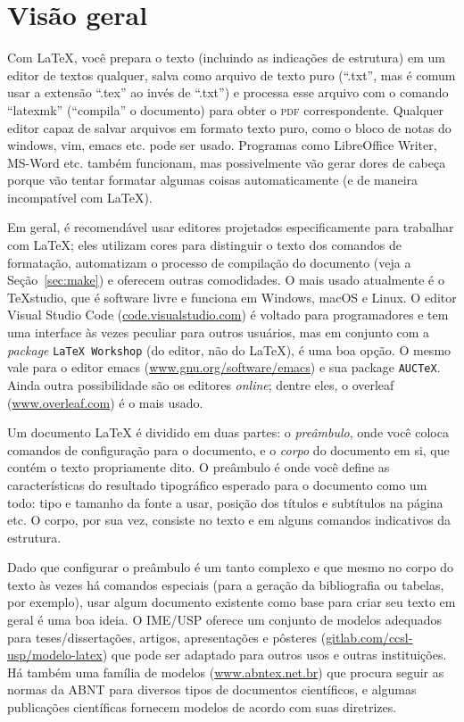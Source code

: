 \section{Visão geral}

\enlargethispage{.5\baselineskip}

Com \LaTeX{}, você prepara o texto (incluindo as indicações de estrutura) em
um editor de textos qualquer, salva como arquivo de texto puro (``.txt'',
mas é comum usar a extensão ``.tex'' ao invés de ``.txt'') e processa esse
arquivo com o comando ``latexmk'' (``compila'' o documento) para obter o
\textsc{pdf} correspondente. Qualquer editor capaz de salvar arquivos em formato
texto puro, como o bloco de notas do windows, vim, emacs etc. pode ser usado.
Programas como LibreOffice Writer, MS-Word etc. também funcionam, mas
possivelmente vão gerar dores de cabeça porque vão tentar formatar algumas
coisas automaticamente (e de maneira incompatível com \LaTeX{}).

Em geral, é recomendável usar editores projetados especificamente para
trabalhar com \LaTeX{}; eles utilizam cores para distinguir o texto dos
comandos de formatação, automatizam o processo de compilação do documento
(veja a Seção~\ref{sec:make}) e oferecem outras comodidades. O mais usado
atualmente é o \TeX{}studio, que é software livre e funciona em Windows,
macOS e Linux. O editor Visual Studio Code (\url{code.visualstudio.com})
é voltado para programadores e tem uma interface às vezes peculiar para
outros usuários, mas em conjunto com a \emph{package} \texttt{LaTeX Workshop}
(do editor, não do \LaTeX), é uma boa opção. O mesmo vale para o editor
emacs (\url{www.gnu.org/software/emacs}) e sua package \texttt{AUC\TeX{}}.
Ainda outra possibilidade são os editores \emph{online}; dentre eles, o
overleaf (\url{www.overleaf.com}) é o mais usado.

Um documento \LaTeX{} é dividido em duas partes: o \emph{preâmbulo}, onde
você coloca comandos de configuração para o documento, e o \emph{corpo}
do documento em si, que contém o texto propriamente dito. O preâmbulo é
onde você define as características do resultado tipográfico esperado
para o documento como um todo: tipo e tamanho da fonte a usar, posição
dos títulos e subtítulos na página etc. O corpo, por sua vez, consiste no
texto e em alguns comandos indicativos da estrutura.

Dado que configurar o preâmbulo é um tanto complexo e que mesmo no corpo
do texto às vezes há comandos especiais (para a geração da bibliografia
ou tabelas, por exemplo), usar algum documento existente como base para
criar seu texto em geral é uma boa ideia. O IME/USP oferece um conjunto
de modelos adequados para teses/dissertações, artigos, apresentações e
pôsteres (\url{gitlab.com/ccsl-usp/modelo-latex}) que pode ser adaptado
para outros usos e outras instituições. Há também uma família de modelos
(\url{www.abntex.net.br}) que procura seguir as normas da ABNT para
diversos tipos de documentos científicos, e algumas publicações científicas
fornecem modelos de acordo com suas diretrizes.

